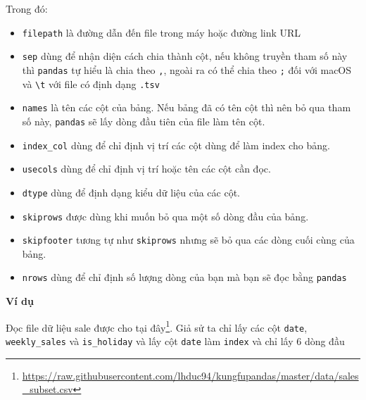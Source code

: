 \documentclass[
]{book}
\renewcommand{\href}[2]{#2\footnote{\url{#1}}}
\begin{document}
Trong đó:

\begin{itemize}
\item
  \texttt{filepath} là đường dẫn đến file trong máy hoặc đường link URL
\item
  \texttt{sep} dùng để nhận diện cách chia thành cột, nếu không truyền tham số này thì \texttt{pandas} tự hiểu là chia theo \texttt{\textquotesingle{},\textquotesingle{}}, ngoài ra có thể chia theo \texttt{\textquotesingle{};\textquotesingle{}} đối với macOS và \texttt{\textquotesingle{}\textbackslash{}t\textquotesingle{}} với file có định dạng \texttt{.tsv}
\item
  \texttt{names} là tên các cột của bảng. Nếu bảng đã có tên cột thì nên bỏ qua tham số này, \texttt{pandas} sẽ lấy dòng đầu tiên của file làm tên cột.
\item
  \texttt{index\_col} dùng để chỉ định vị trí các cột dùng để làm index cho bảng.
\item
  \texttt{usecols} dùng để chỉ định vị trí hoặc tên các cột cần đọc.
\item
  \texttt{dtype} dùng để định dạng kiểu dữ liệu của các cột.
\item
  \texttt{skiprows} được dùng khi muốn bỏ qua một số dòng đầu của bảng.
\item
  \texttt{skipfooter} tương tự như \texttt{skiprows} nhưng sẽ bỏ qua các dòng cuối cùng của bảng.
\item
  \texttt{nrows} dùng để chỉ định số lượng dòng của bạn mà bạn sẽ đọc bằng \texttt{pandas}
\end{itemize}

\textbf{Ví dụ}

Đọc file dữ liệu sale được cho tại \href{https://raw.githubusercontent.com/lhduc94/kungfupandas/master/data/sales_subset.csv}{đây}. Giả sử ta chỉ lấy các cột \texttt{date}, \texttt{weekly\_sales} và \texttt{is\_holiday} và lấy cột \texttt{date} làm \texttt{index} và chỉ lấy 6 dòng đầu
\end{document}
